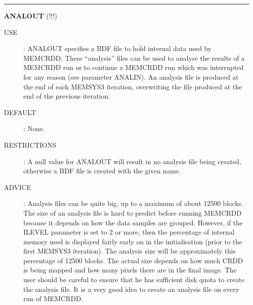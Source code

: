 \rule{\textwidth}{0.3mm}
{\Large {\bf ANALOUT} (!!!)}
\begin{description}
\item [USE]:
ANALOUT specifies a BDF file to hold internal data used by MEMCRDD. These
``analysis'' files can be used to analyse the results of a MEMCRDD run or
to continue a MEMCRDD run which was interrupted for any reason (see parameter 
ANALIN). An analysis file is produced at the end of each MEMSYS3 iteration, 
overwriting the file produced at the end of the previous iteration.
\item [DEFAULT]:
None.
\item [RESTRICTIONS]:
A null value for ANALOUT will result in no analysis file being created, 
otherwise a BDF file is created with the given name.
\item [ADVICE]:
Analysis files can be quite big, up to a maximum of about 12500 blocks.
The size of an analysis file is hard to predict before running MEMCRDD because
it depends on how the data samples are grouped. However, if the ILEVEL 
parameter is
set to 2 or more, then the percentage of internal memory used is displayed
fairly early on in the initialisation (prior to the first MEMSYS3 iteration).
The analysis size will be approximately this percentage of 12500 blocks.
The actual size depends on how much CRDD is being mapped and how many
pixels there are in the final image. The user should be careful to ensure that
he has sufficient disk quota to create the analysis file. It is a very good
idea to create an analysis file on every run of MEMCRDD.
\end {description}

